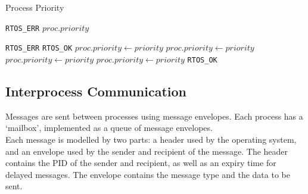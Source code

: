 \documentclass[12pt]{report}
\begin{document}
\begin{algorithm}
\caption{Process Priority}
\label{alg:processpriority}
\begin{algorithmic}[1]
        \State \Return \texttt{RTOS_ERR}
    \EndIf
    \State \Return $proc.priority$
\EndProcedure

\Statex

        \State \Return \texttt{RTOS_ERR}
    \EndIf
        \State \Return \texttt{RTOS_OK} 
    \EndIf
        \State {}
        \State $proc.priority \leftarrow priority$
        \State {}
        \State {}
        \State $proc.priority \leftarrow priority$
        \State {}
        \State {}
        \State $proc.priority \leftarrow priority$
        \State {}
    \Else
        \State $proc.priority \leftarrow priority$
    \EndIf
    \State {}
    \State \Return \texttt{RTOS_OK}
\EndProcedure
\end{algorithmic}
\end{algorithm}

\subsection{Interprocess Communication}

Messages are sent between processes using message envelopes. Each process has a `mailbox', implemented as a queue of message envelopes.\\

Each message is modelled by two parts: a header used by the operating system, and an envelope used by the sender and recipient of the message. The header contains the PID of the sender and recipient, as well as an expiry time for delayed messages. The envelope contains the message type and the data to be sent.\\
\end{document}
